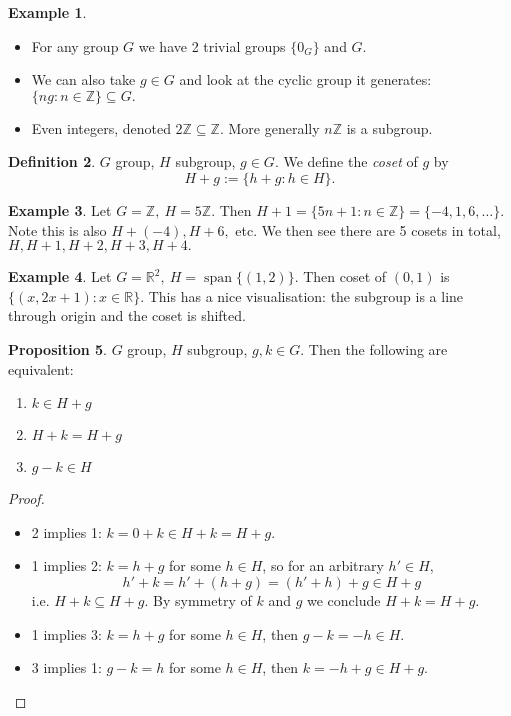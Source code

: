 \documentclass[a4paper]{article}
\newcommand{\spanset}{\operatorname{span}}
\theoremstyle{definition}
\newtheorem{defn}{Definition}[subsection]
\newtheorem{prop}[defn]{Proposition}
\newtheorem{example}[defn]{Example}
\begin{document}
\begin{example}
\begin{itemize}
    \item For any group $G$ we have 2 trivial groups $\{0_G\}$ and $G$.
    \item We can also take $g\in G$ and look at the cyclic group it generates: $\{ng : n\in \mathbb Z \} \subseteq G.$
    \item Even integers, denoted $2\mathbb Z\subseteq \mathbb Z$. More generally $n\mathbb Z$ is a subgroup.
\end{itemize}
\end{example}

\begin{defn}
$G$ group, $H$ subgroup, $g\in G$. We define the \textit{coset} of $g$ by
\[
H+g := \{ h+g : h\in H\} .
\]
\end{defn}
\begin{example}
Let $G=\mathbb Z,\ H=5\mathbb Z$. Then $H+1=\{5n+1 :n\in \mathbb Z\}=\{-4,1,6,\ldots\}$. Note this is also $H+(-4),H+6,$ etc. We then see there are 5 cosets in total, $H,H+1,H+2,H+3,H+4.$
\end{example}
\begin{example}
Let $G=\mathbb R^2,\ H=\spanset \{(1,2)\}$. Then coset of $(0,1)$ is $\{(x,2x+1):x\in \mathbb R\}$. This has a nice visualisation: the subgroup is a line through origin and the coset is shifted.
\end{example}
\begin{prop}
$G$ group, $H$ subgroup, $g,k\in G$. Then the following are equivalent:
\begin{enumerate}
    \item $k\in H+g$
    \item $H+k=H+g$
    \item $g-k \in H$
\end{enumerate}
\end{prop}
\begin{proof}
\begin{itemize}
    \item 2 implies 1: $k=0+k\in H+k=H+g$.
    \item 1 implies 2: $k=h+g$ for some $h\in H$, so for an arbitrary $h'\in H$,
    \[
    h'+k=h'+(h+g)=(h'+h)+g \in H+g
    \]
    i.e. $H+k \subseteq H+g$. By symmetry of $k$ and $g$ we conclude $H+k=H+g.$
    \item 1 implies 3: $k=h+g$ for some $h\in H$, then $g-k=-h\in H$.
    \item 3 implies 1: $g-k=h$ for some $h\in H$, then $k=-h+g\in H+g$.
\end{itemize}
\end{proof}
\end{document}
